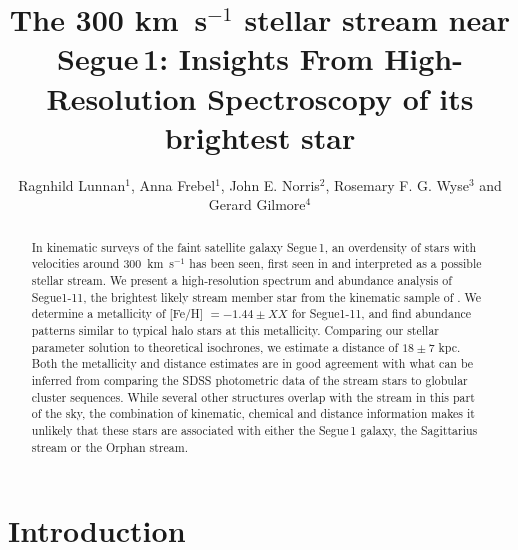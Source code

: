 \documentclass{emulateapj}
\begin{document}
\title{The 300 km~s$^{-1}$ stellar stream near Segue\,1: Insights From High-Resolution Spectroscopy of its brightest star}
\author{Ragnhild Lunnan$^1$,  Anna Frebel$^1$, John E. Norris$^2$, Rosemary F. G. Wyse$^3$ and Gerard Gilmore$^4$}


\begin{abstract}
In kinematic surveys of the faint satellite galaxy Segue\,1, an overdensity of stars with velocities around 300~km~s$^{-1}$ has been seen, first seen in \citet{Geha2009} and interpreted as a possible stellar stream. We present a high-resolution spectrum and abundance analysis of Segue1-11, the brightest likely stream member star from the kinematic sample of \citet{Norris2010a}. We determine a metallicity of [Fe/H] $ = -1.44 \pm XX$ for Segue1-11, and find abundance patterns similar to typical halo stars at this metallicity. Comparing our stellar parameter solution to theoretical isochrones, we estimate a distance of $18 \pm 7$ kpc. Both the metallicity and distance estimates are in good agreement with what can be inferred from comparing the SDSS photometric data of the stream stars to globular cluster sequences. While several other structures overlap with the stream in this part of the sky, the combination of kinematic, chemical and distance information makes it unlikely that these stars are associated with either the Segue\,1 galaxy, the Sagittarius stream or the Orphan stream.

\end{abstract}





\section{Introduction}
\label{sec:intro}
 
\end{document}
